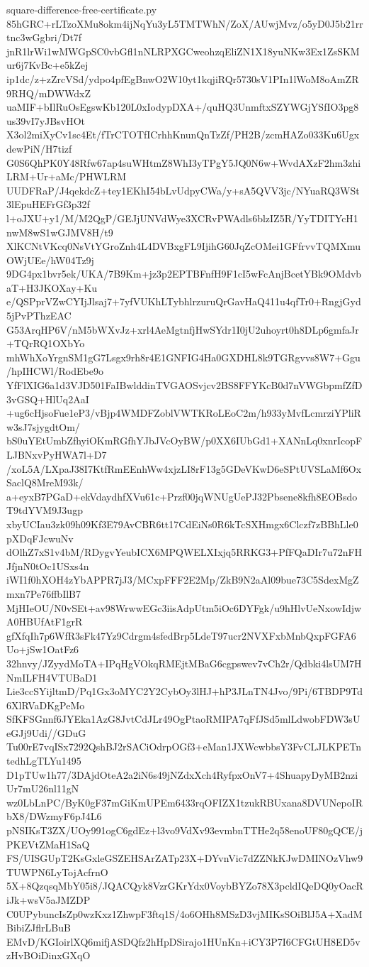 \documentclass[11pt]{article}
\theoremstyle{definition}
\theoremstyle{remark}
\begin{document}
\begin{filecontents*}[overwrite]{square-difference-free-certificate.py}
85hGRC+rLTzoXMu8okm4ijNqYu3yL5TMTWhN/ZoX/AUwjMvz/o5yD0J5b21rrtnc3wGgbri/Dt7f
jnR1lrWi1wMWGpSC0vbGfl1nNLRPXGCweohzqEliZN1X18yuNKw3Ex1ZsSKMur6j7KvBc+e5kZej
ip1dc/z+zZrcVSd/ydpo4pfEgBnwO2W10yt1kqjiRQr5730sV1PIn1lWoM8oAmZR9RHQ/mDWWdxZ
uaMIF+bIlRuOsEgswKb120L0xIodypDXA+/quHQ3UnmftxSZYWGjYSfIO3pg8us39vI7yJBsvHOt
X3ol2miXyCv1sc4Et/fTrCTOTfICrhhKnunQnTzZf/PH2B/zcmHAZo033Ku6UgxdewPiN/H7tizf
G0S6QhPK0Y48Rfw67ap4suWHtmZ8WhI3yTPgY5JQ0N6w+WvdAXzF2hm3zhiLRM+Ur+aMc/PHWLRM
UUDFRaP/J4qekdcZ+tey1EKhI54bLvUdpyCWa/y+sA5QVV3jc/NYuaRQ3WSt3lEpuHEFrGf3p32f
l+oJXU+y1/M/M2QgP/GEJjUNVdWye3XCRvPWAdls6blzIZ5R/YyTDITYcH1nwM8wS1wGJMV8H/t9
XlKCNtVKcq0NsVtYGroZnh4L4DVBxgFL9IjihG60JqZcOMei1GFfrvvTQMXmuOWjUEe/hW04Tz9j
9DG4px1bvr5ek/UKA/7B9Km+jz3p2EPTBFnfH9F1cI5wFcAnjBcetYBk9OMdvbaT+H3JKOXay+Ku
e/QSPprVZwCYIjJlsaj7+7yfVUKhLTybhlrzuruQrGavHaQ411u4qfTr0+RngjGyd5jPvPThzEAC
G53ArqHP6V/nM5bWXvJz+xrl4AeMgtnfjHwSYdr1I0jU2uhoyrt0h8DLp6gmfaJr+TQrRQ1OXbYo
mhWhXoYrgnSM1gG7Lsgx9rh8r4E1GNFIG4Ha0GXDHL8k9TGRgvvs8W7+Ggu/hpIHCWl/RodEbe9o
YfFlXIG6a1d3VJD501FaIBwlddinTVGAOSvjcv2BS8FFYKcB0d7nVWGbpmfZfD3vGSQ+HlUq2AaI
+ug6cHjsoFue1eP3/vBjp4WMDFZoblVWTKRoLEoC2m/h933yMvfLcmrziYPliRw3sJ7sjygdtOm/
bS0uYEtUmbZfhyiOKmRGfhYJbJVcOyBW/p0XX6IUbGd1+XANnLq0xnrIcopFLJBNxvPyHWA7l+D7
/xoL5A/LXpaJ38I7KtfRmEEnhWw4xjzLI8rF13g5GDeVKwD6eSPtUVSLaMf6OxSaclQ8MreM93k/
a+eyxB7PGaD+ekVdaydhfXVu61c+Przf00jqWNUgUePJ32Pbsene8kfh8EOBsdoT9tdYVM9J3ugp
xbyUCIau3zk09h09Kf3E79AvCBR6tt17CdEiNs0R6kTcSXHmgx6Clczf7zBBhLle0pXDqFJcwuNv
dOlhZ7xS1v4bM/RDygvYeubICX6MPQWELXIxjq5RRKG3+PfFQaDIr7u72nFHJfjnN0tOc1USxs4n
iWI1f0hXOH4zYbAPPR7jJ3/MCxpFFF2E2Mp/ZkB9N2aAl09bue73C5SdexMgZmxn7Pe76ffbIlB7
MjHIeOU/N0vSEt+av98WrwwEGc3iisAdpUtm5iOc6DYFgk/u9hHlvUeNxowIdjwA0HBUfAtF1grR
gfXfqIh7p6WfR3sFk47Yz9Cdrgm4sfedBrp5LdeT97ucr2NVXFxbMnbQxpFGFA6Uo+jSw1OatFz6
32hnvy/JZyydMoTA+IPqHgVOkqRMEjtMBaG6cgpswev7vCh2r/Qdbki4lsUM7HNmILFH4VTUBaD1
Lie3ccSYijltmD/Pq1Gx3oMYC2Y2CybOy3lHJ+hP3JLnTN4Jvo/9Pi/6TBDP9Td6XlRVaDKgPeMo
SfKFSGnnf6JYEka1AzG8JvtCdJLr49OgPtaoRMIPA7qFfJSd5mlLdwobFDW3sUeGJj9Udi//GDuG
Tu00rE7vqISx7292QshBJ2rSACiOdrpOGf3+eMan1JXWcwbbsY3FvCLJLKPETntedhLgTLYu1495
D1pTUw1h77/3DAjdOteA2a2iN6s49jNZdxXch4RyfpxOnV7+4ShuapyDyMB2nziUr7mU26nl11gN
wz0LbLnPC/ByK0gF37mGiKmUPEm6433rqOFIZX1tzukRBUxana8DVUNepoIRbX8/DWzmyF6pJ4L6
pNSIKsT3ZX/UOy991ogC6gdEz+l3vo9VdXv93evmbnTTHe2q58enoUF80gQCE/jPKEVtZMaH1SaQ
FS/UISGUpT2KsGxleGSZEHSArZATp23X+DYvnVic7dZZNkKJwDMINOzVhw9TUWPN6LyTojAcfrnO
5X+8QzqsqMbY05i8/JQACQyk8VzrGKrYdx0VoybBYZo78X3pcldIQeDQ0yOacRiJk+wsV5aJMZDP
C0UPybuncIsZp0wzKxz1ZhwpF3ftq1S/4o6OHh8MSzD3vjMIKsSOiBlJ5A+XadMBibiZJflrLBuB
EMvD/KGIoirlXQ6mifjASDQfz2hHpDSirajo1HUnKn+iCY3P7I6CFGtUH8ED5vzHvBOiDinxGXqO

\end{filecontents*}
\end{document}

